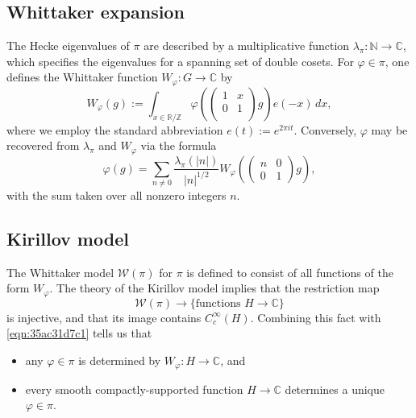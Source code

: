 \documentclass[reqno]{amsart} 
\numberwithin{equation}{section}
\begin{document}
\subsection{Whittaker expansion}\label{sec:35ac3e587a}
The Hecke eigenvalues of $\pi$ are described by a multiplicative function $\lambda_\pi : \mathbb{N} \rightarrow \mathbb{C}$, which specifies the eigenvalues for a spanning set of double cosets.  For $\varphi \in \pi$, one defines the Whittaker function $W_\varphi : G \rightarrow \mathbb{C}$ by
\begin{equation*}
  W_\varphi (g) :=
  \int_{x \in \mathbb{R} / \mathbb{Z} } \varphi \left(
    \begin{pmatrix}
1 & x \\
0 & 1 \\
\end{pmatrix} g \right) e(-x) \, d x,
\end{equation*}
where we employ the standard abbreviation $e(t) := e^{2 \pi i t}$.  Conversely, $\varphi$ may be recovered from $\lambda_\pi$ and $W_\varphi$ via the formula
\begin{equation}\label{eqn:35ac31d7c1}
  \varphi(g) = \sum _{n \neq 0}
  \frac{\lambda_{\pi}(|n|)}{|n|^{1/2}}
  W_\varphi \left( \begin{pmatrix}
      n & 0 \\
      0 & 1
    \end{pmatrix} g \right),
\end{equation}
with the sum taken over all nonzero integers $n$.

\subsection{Kirillov model}\label{sec:35ac31dd2c}
The Whittaker model $\mathcal{W}(\pi)$ for $\pi$ is defined to consist of all functions of the form $W_\varphi$.  The theory of the Kirillov model implies that the restriction map
\begin{equation*}
\mathcal{W}(\pi) \rightarrow \{\text{functions } H \rightarrow \mathbb{C} \}
\end{equation*}
is injective, and that its image contains $C_c^\infty(H)$.  Combining this fact with \eqref{eqn:35ac31d7c1} tells us that
\begin{itemize}
\item any $\varphi \in \pi$ is determined by $W_\varphi : H \rightarrow \mathbb{C}$, and
\item every smooth compactly-supported function $H \rightarrow \mathbb{C}$ determines a unique $\varphi \in \pi$.
\end{itemize}
\end{document}
